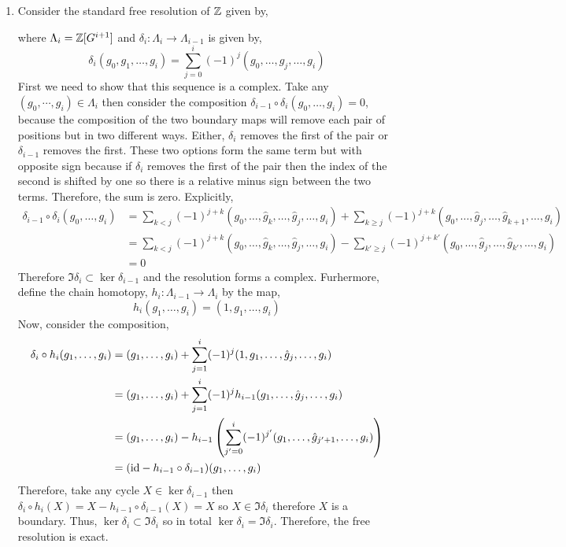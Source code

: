 \documentclass[12pt]{extarticle}
\begin{document}
 
\begin{enumerate}
\item Consider the standard free resolution of $\mathbb{Z}$ given by,
\begin{center}
\end{center}
where $\Lambda_i = \mathbb{Z}[G^{i+1}]$ and $\delta_i : \Lambda_i \to \Lambda_{i-1}$ is given by,
\[ \delta_i(g_0, g_1, \dots, g_i) = \sum_{j = 0}^i (-1)^j (g_0, \dots, \hat{g}_j, \dots, g_i) \]
First we need to show that this sequence is a complex. Take any $(g_0, \cdots, g_i) \in \Lambda_i$ then consider the composition $\delta_{i-1} \circ \delta_{i}(g_0, \dots, g_i) = 0$,
because the composition of the two boundary maps will remove each pair of positions but in two different ways. Either, $\delta_i$ removes the first of the pair or $\delta_{i-1}$ removes the first. These two options form the same term but with opposite sign because if $\delta_i$ removes the first of the pair then the index of the second is shifted by one so there is a relative minus sign between the two terms. Therefore, the sum is zero. Explicitly,
\begin{align*}
\delta_{i-1} \circ \delta_{i}(g_0, \dots, g_i) & = \sum_{k < j} (-1)^{j + k} (g_0, \dots, \hat{g}_k, \dots, \hat{g}_j, \dots, g_i) + \sum_{k \ge j} (-1)^{j + k} (g_0, \dots, \hat{g}_j, \dots, \hat{g}_{k+1}, \dots, g_i)
\\
& = \sum_{k < j} (-1)^{j + k} (g_0, \dots, \hat{g}_k, \dots, \hat{g}_j, \dots, g_i) - \sum_{k' \ge j} (-1)^{j + k'} (g_0, \dots, \hat{g}_j, \dots, \hat{g}_{k'}, \dots, g_i)
\\
& = 0
\end{align*}
Therefore $\Im{\delta_{i}} \subset \ker{\delta_{i-1}}$ and the resolution forms a complex. Furhermore, define the chain homotopy, $h_i : \Lambda_{i-1} \to \Lambda_i$ by the map,
\[ h_i(g_1, \dots, g_i) = (1, g_1, \dots, g_i) \]
Now, consider the composition,
\begin{align*}
\delta_{i} \circ h_i(g_1, \dots, g_i) & = (g_1, \dots, g_i) + \sum_{j = 1}^i  (-1)^j (1, g_1, \dots, \hat{g}_j, \dots, g_i) 
\\
& = (g_1, \dots, g_i) + \sum_{j = 1}^i  (-1)^j h_{i-1}(g_1, \dots, \hat{g}_j, \dots, g_i) 
\\
& = (g_1, \dots, g_i) - h_{i-1} \left( \sum_{j' = 0}^i  (-1)^{j'} (g_1, \dots, \hat{g}_{j'+1}, \dots, g_i) \right)
\\
& = (\mathrm{id} - h_{i-1} \circ \delta_{i-1}) (g_1, \dots, g_i)
\end{align*}
Therefore, take any cycle $X \in \ker{\delta_{i-1}}$ then $\delta_{i} \circ h_i(X) = X - h_{i-1} \circ \delta_{i-1}(X) = X$ so $X \in \Im{\delta_{i}}$ therefore $X$ is a boundary. Thus, $\ker{\delta_{i}} \subset \Im{\delta_i}$ so in total $\ker{\delta_i} = \Im{\delta_i}$. Therefore, the free resolution is exact. 
 

\end{enumerate}
\end{document}
